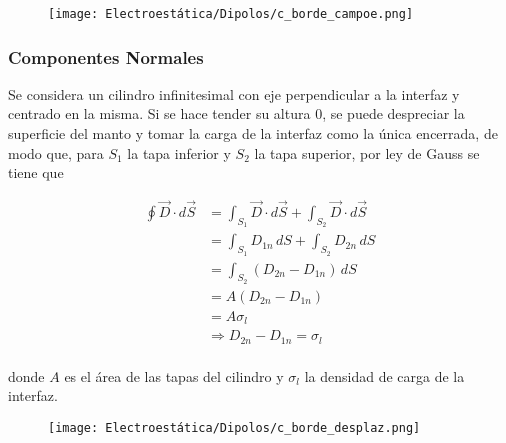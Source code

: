 \begin{figure}[H]
    \centering
    \texttt{[image: Electroestática/Dipolos/c\_borde\_campoe.png]}
\end{figure}

\subsubsection{Componentes Normales}

Se considera un cilindro infinitesimal con eje perpendicular a la interfaz y centrado en la misma. Si se hace tender su altura 0, se puede despreciar la superficie del manto y tomar la carga de la interfaz como la única encerrada, de modo que, para $S_1$ la tapa inferior y $S_2$ la tapa superior, por ley de Gauss se tiene que

\begin{equation}
\begin{split}
    \oint\Vec{D}\cdot d\Vec{S}&=\int_{S_1}\Vec{D}\cdot d\Vec{S}+\int_{S_2}\Vec{D}\cdot d\Vec{S}\\
    &=\int_{S_1}D_{1n}\,dS+\int_{S_2}D_{2n}\,dS\\
    &=\int_{S_2}(D_{2n}-D_{1n})\,dS\\
    &=A(D_{2n}-D_{1n})\\
    &=A\sigma_l\\
    &\Rightarrow D_{2n}-D_{1n} = \sigma_l\\
\end{split}
\nonumber
\end{equation}
\bigbreak

donde $A$ es el área de las tapas del cilindro y $\sigma_l$ la densidad de carga de la interfaz.

\begin{figure}[H]
    \centering
    \texttt{[image: Electroestática/Dipolos/c\_borde\_desplaz.png]}
\end{figure}

\newpage